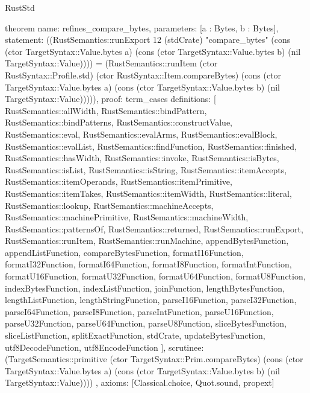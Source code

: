 \begin{lexlean}{RustStd}
\begin{semanticmodule}
theorem{
  name: refines_compare_bytes,
  parameters: [a : Bytes, b : Bytes],
  statement: ((RustSemantics::runExport 12 (stdCrate) "compare_bytes" (cons (ctor TargetSyntax::Value.bytes a) (cons (ctor TargetSyntax::Value.bytes b) (nil TargetSyntax::Value)))) = (RustSemantics::runItem (ctor RustSyntax::Profile.std) (ctor RustSyntax::Item.compareBytes) (cons (ctor TargetSyntax::Value.bytes a) (cons (ctor TargetSyntax::Value.bytes b) (nil TargetSyntax::Value))))),
  proof: term_cases{
    definitions: [
      RustSemantics::allWidth,
      RustSemantics::bindPattern,
      RustSemantics::bindPatterns,
      RustSemantics::constructValue,
      RustSemantics::eval,
      RustSemantics::evalArms,
      RustSemantics::evalBlock,
      RustSemantics::evalList,
      RustSemantics::findFunction,
      RustSemantics::finished,
      RustSemantics::hasWidth,
      RustSemantics::invoke,
      RustSemantics::isBytes,
      RustSemantics::isList,
      RustSemantics::isString,
      RustSemantics::itemAccepts,
      RustSemantics::itemOperands,
      RustSemantics::itemPrimitive,
      RustSemantics::itemTakes,
      RustSemantics::itemWidth,
      RustSemantics::literal,
      RustSemantics::lookup,
      RustSemantics::machineAccepts,
      RustSemantics::machinePrimitive,
      RustSemantics::machineWidth,
      RustSemantics::patternsOf,
      RustSemantics::returned,
      RustSemantics::runExport,
      RustSemantics::runItem,
      RustSemantics::runMachine,
      appendBytesFunction,
      appendListFunction,
      compareBytesFunction,
      formatI16Function,
      formatI32Function,
      formatI64Function,
      formatI8Function,
      formatIntFunction,
      formatU16Function,
      formatU32Function,
      formatU64Function,
      formatU8Function,
      indexBytesFunction,
      indexListFunction,
      joinFunction,
      lengthBytesFunction,
      lengthListFunction,
      lengthStringFunction,
      parseI16Function,
      parseI32Function,
      parseI64Function,
      parseI8Function,
      parseIntFunction,
      parseU16Function,
      parseU32Function,
      parseU64Function,
      parseU8Function,
      sliceBytesFunction,
      sliceListFunction,
      splitExactFunction,
      stdCrate,
      updateBytesFunction,
      utf8DecodeFunction,
      utf8EncodeFunction
    ],
    scrutinee: (TargetSemantics::primitive (ctor TargetSyntax::Prim.compareBytes) (cons (ctor TargetSyntax::Value.bytes a) (cons (ctor TargetSyntax::Value.bytes b) (nil TargetSyntax::Value))))
  },
  axioms: [Classical.choice, Quot.sound, propext]
}


\end{semanticmodule}
\end{lexlean}

